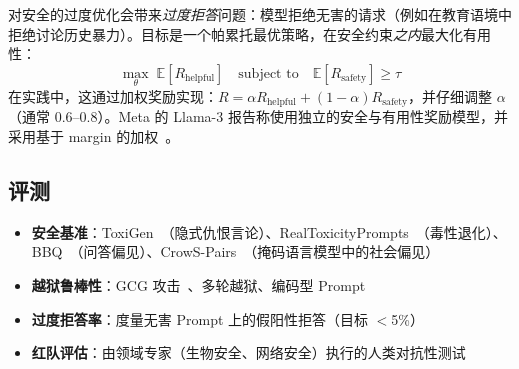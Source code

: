 \begin{intuitionbox}[在有用性与安全性之间平衡]
对安全的过度优化会带来\emph{过度拒答}问题：模型拒绝无害的请求（例如在教育语境中拒绝讨论历史暴力）。目标是一个帕累托最优策略，在安全约束\emph{之内}最大化有用性：
\[
\max_\theta \; \mathbb{E}[R_\text{helpful}] \quad \text{subject to} \quad \mathbb{E}[R_\text{safety}] \geq \tau
\]
在实践中，这通过加权奖励实现：$R = \alpha R_\text{helpful} + (1-\alpha) R_\text{safety}$，并仔细调整 $\alpha$（通常 0.6--0.8）。Meta 的 Llama-3 报告称使用独立的安全与有用性奖励模型，并采用基于 margin 的加权~\cite{grattafiori2024llama3}。
\end{intuitionbox}

\subsection{评测}
\label{evaluation}

\begin{itemize}
\item \textbf{安全基准}：ToxiGen~\cite{hartvigsen2022toxigen}（隐式仇恨言论）、RealToxicityPrompts~\cite{gehman2020realtoxicityprompts}（毒性退化）、BBQ~\cite{parrish2022bbq}（问答偏见）、CrowS-Pairs~\cite{nangia2020crows}（掩码语言模型中的社会偏见）
  \item \textbf{越狱鲁棒性}：GCG 攻击~\cite{zou2023universal}、多轮越狱、编码型 Prompt
  \item \textbf{过度拒答率}：度量无害 Prompt 上的假阳性拒答（目标 $<$5\%）
  \item \textbf{红队评估}：由领域专家（生物安全、网络安全）执行的人类对抗性测试
\end{itemize}

